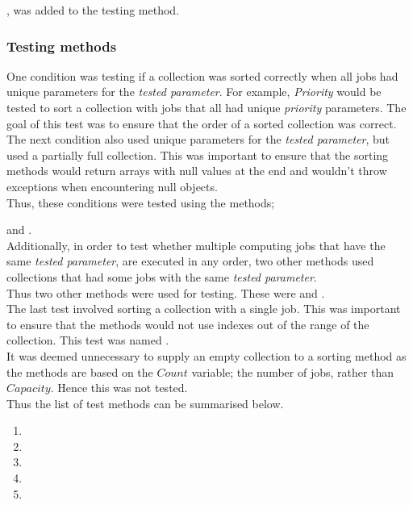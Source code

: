 \documentclass[a4paper]{article}
\begin{document}
, was added to the testing method.
\\[3pt]
\subsubsection{Testing methods}
One condition was testing if a collection was sorted correctly when all jobs had unique parameters for the \textit{tested parameter}. For example, \textit{Priority} would be tested to sort a collection with jobs that all had unique \textit{priority} parameters. The goal of this test was to ensure that the order of a sorted collection was correct. 
\\[3pt]
The next condition also used unique parameters for the \textit{tested parameter}, but used a partially full collection. This was important to ensure that the sorting methods would return arrays with null values at the end and wouldn't throw exceptions when encountering null objects.
\\[6pt]
Thus, these conditions were tested using the methods; 

 and .
\\[10pt]
Additionally, in order to test whether multiple computing jobs that have the same \textit{tested parameter}, are executed in any order, two other methods used collections that had some jobs with the same \textit{tested parameter}. 
\\[3pt]
Thus two other methods were used for testing. These were  and .
\\[10pt]
The last test involved sorting a collection with a single job. This was important to ensure that the methods would not use indexes out of the range of the collection. This test was named .
\\[3pt]
It was deemed unnecessary to supply an empty collection to a sorting method as the methods are based on the $Count$ variable; the number of jobs, rather than $Capacity$. Hence this was not tested.
\\[10pt]
Thus the list of test methods can be summarised below.
\begin{enumerate}
   \item {}
   \item {}
   \item {}
   \item {}
   \item {}
\end{enumerate}
\end{document}
